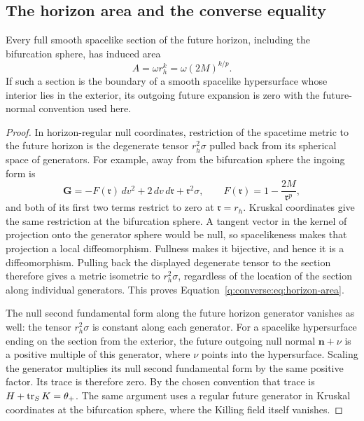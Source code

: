 \subsection{The horizon area and the converse equality}

\begin{lemma}
\label{q:converse:lem:horizon-area}
Every full smooth spacelike section of the future horizon, including
the bifurcation sphere, has induced area
\begin{equation}
 A=\omega r_h^k=\omega(2M)^{k/p}.
 \label{q:converse:eq:horizon-area}
\end{equation}
If such a section is the boundary of a smooth spacelike hypersurface
whose interior lies in the exterior, its outgoing future expansion
is zero with the future-normal convention used here.
\end{lemma}

\begin{proof}
In horizon-regular null coordinates, restriction of the spacetime
metric to the future horizon is the degenerate tensor
$r_h^2\sigma$ pulled back from its spherical space of generators.
For example, away from the bifurcation sphere the ingoing form is
\[
 \mathbf G=-F(\mathfrak r)\,dv^2
       +2\,dv\,d\mathfrak r+\mathfrak r^2\sigma,
 \qquad F(\mathfrak r)=1-\frac{2M}{\mathfrak r^p},
\]
and both of its first two terms restrict to zero at
$\mathfrak r=r_h$.  Kruskal coordinates give the same restriction at
the bifurcation sphere.  A tangent vector in the kernel of projection
onto the generator sphere would be null, so spacelikeness makes that
projection a local diffeomorphism.  Fullness makes it bijective, and
hence it is a diffeomorphism.
Pulling back the displayed degenerate tensor to the section therefore
gives a metric isometric to $r_h^2\sigma$, regardless of the location
of the section along individual generators.  This proves
Equation~\eqref{q:converse:eq:horizon-area}.

The null second fundamental form along the future horizon generator
vanishes as well: the tensor $r_h^2\sigma$ is constant along each
generator.  For a spacelike hypersurface ending on the section from
the exterior, the future outgoing null normal $\mathbf n+\nu$ is
a positive multiple of this generator, where $\nu$ points into the
hypersurface.  Scaling the generator multiplies its null second
fundamental form by the same positive factor.  Its trace is therefore
zero.  By the chosen convention that trace is
$H+\operatorname{tr}_S K=\theta_+$.
The same argument uses a regular future generator in Kruskal
coordinates at the bifurcation sphere, where the Killing field itself
vanishes.
\end{proof}

